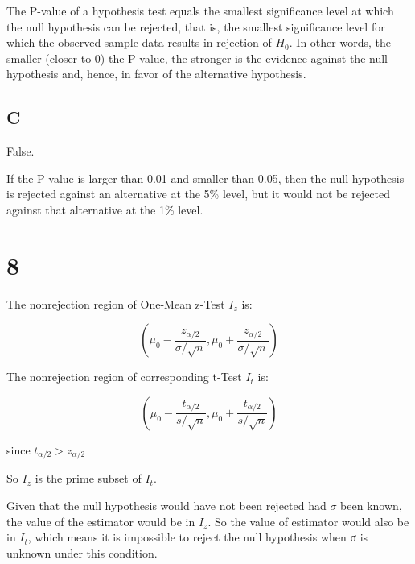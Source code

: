 \documentclass{article}
\begin{document}
	The P-value of a hypothesis test equals the smallest
	significance level at which the null hypothesis can be rejected, that is, the smallest significance level for
which the observed sample data results in rejection of $H_0$. In other words, the smaller (closer to 0) the P-value, the stronger is the evidence against the null hypothesis and, hence, in favor of the alternative hypothesis.	
	\subsection*{C}
	
	False.
	
	If the P-value is larger than 0.01 and smaller than 0.05, then the null hypothesis is rejected against an alternative at the 5\% level, but it would not be rejected against that alternative at the 1\% level.
	
	\section*{8}
	
	The nonrejection region of One-Mean z-Test $I_z$ is:
	
	\[
	(\mu_0-\frac{z_{\alpha/2}}{\sigma/\sqrt{n}},\mu_0+\frac{z_{\alpha/2}}{\sigma/\sqrt{n}})
	\]
	
	The nonrejection region of corresponding t-Test $I_t$ is:
	
	\[
	(\mu_0-\frac{t_{\alpha/2}}{s/\sqrt{n}},\mu_0+\frac{t_{\alpha/2}}{s/\sqrt{n}})
	\]
	
	since $t_{\alpha/2}>z_{\alpha/2}$
	
	So $I_z$ is the prime subset of $I_t$.
	
	Given that the null hypothesis would have not been rejected had $\sigma$ been known, the value of the estimator would be in $I_z$. So the value of estimator would also be in $I_t$, which means it is impossible to reject the null hypothesis when σ is unknown under this condition.
	
\end{document}
